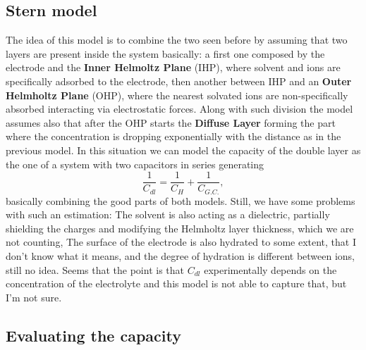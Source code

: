 \subsection{Stern model}

The idea of this model is to combine the two seen before by assuming that two layers are present inside the system basically: a first one composed by the electrode and the \textbf{Inner Helmoltz Plane} (IHP), where solvent and ions are specifically adsorbed to the electrode, then another between IHP and an \textbf{Outer Helmholtz Plane} (OHP), where the nearest solvated ions are non-specifically absorbed interacting via electrostatic forces. Along with such division the model assumes also that after the OHP starts the \textbf{Diffuse Layer} forming the part where the concentration is dropping exponentially with the distance as in the previous model. In this situation we can model the capacity of the double layer as the one of a system with two capacitors in series generating
\begin{equation}
    \frac{1}{C_{dl}} = \frac{1}{C_H} + \frac{1}{C_{G.C.}},
\end{equation}
basically combining the good parts of both models. Still, we have some problems with such an estimation: The solvent is also acting as a dielectric, partially shielding the charges and modifying the Helmholtz layer thickness, which we are not counting, The surface of the electrode is also hydrated to some extent, that I don't know what it means, and the degree of hydration is different between ions, still no idea. Seems that the point is that $C_{dl}$ experimentally depends on the concentration of the electrolyte and this model is not able to capture that, but I'm not sure.

\subsection{Evaluating the capacity}

